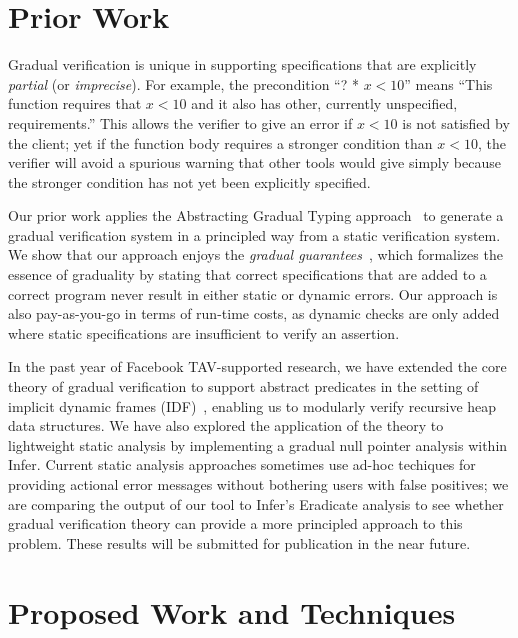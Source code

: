 \documentclass[12pt,twocolumn]{article}
\begin{document}
\begin{sloppypar}
\vspace{-2ex}
\section{Prior Work}
\vspace{-2ex}

Gradual verification is unique in supporting specifications that are explicitly \textit{partial} (or {\em imprecise}).  For example, the precondition ``? * $x<10$'' means ``This function requires that $x<10$ and it also has other, currently unspecified, requirements.''  This allows the verifier to give an error if $x<10$ is not satisfied by the client; yet if the function body requires a stronger condition than $x<10$, the verifier will avoid a spurious warning that other tools would give simply because the stronger condition has not yet been explicitly specified. 

Our prior work applies the Abstracting Gradual Typing approach~\cite{garciaAl:popl2016} to generate a gradual verification system in a principled way from a static verification system.  We show that our approach enjoys the \textit{gradual guarantees}~\cite{siekAl:snapl2015}, which formalizes the essence of graduality by stating that correct specifications that are added to a correct program never result in either static or dynamic errors.  Our approach is also pay-as-you-go in terms of run-time costs, as dynamic checks are only added where static specifications are insufficient to verify an assertion.

In the past year of Facebook TAV-supported research, we have extended the core theory of gradual verification to support abstract predicates in the setting of implicit dynamic frames (IDF)~\cite{smansAl:toplas2012}, enabling us to modularly verify recursive heap data structures.  We have also explored the application of the theory to lightweight static analysis by implementing a gradual null pointer analysis within Infer.  Current static analysis approaches sometimes use ad-hoc techiques for providing actional error messages without bothering users with false positives; we are comparing the output of our tool to Infer's Eradicate analysis to see whether gradual verification theory can provide a more principled approach to this problem.  These results will be submitted for publication in the near future.

\vspace{-2ex}
\section{Proposed Work and Techniques}
\vspace{-2ex}


\end{sloppypar}
\end{document}
